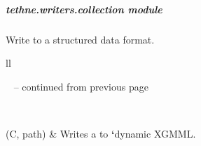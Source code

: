 \documentclass[letterpaper,10pt,english]{sphinxmanual}
\begin{document}
\subparagraph{tethne.writers.collection module}
\label{tethne.writers.collection:module-tethne.writers.collection}\label{tethne.writers.collection::doc}\label{tethne.writers.collection:tethne-writers-collection-module}
Write {\hyperref[tethne.classes.graphcollection:tethne.classes.graphcollection.GraphCollection]{}} to a structured data format.

\begin{longtable}{ll}
\hline
\endfirsthead

%
{{\textsf{\tablename\ \thetable{} -- continued from previous page}}} \\
\hline
\endhead

\hline {} \\ \hline
\endfoot

\endlastfoot


{\hyperref[tethne.writers.collection:tethne.writers.collection.to_dxgmml]{}}(C, path)
 & 
Writes a {\hyperref[tethne.classes.graphcollection:tethne.classes.graphcollection.GraphCollection]{}} to  {\color{red}\bfseries{}{}`}dynamic XGMML.
\\
\hline\end{longtable}

\end{document}
